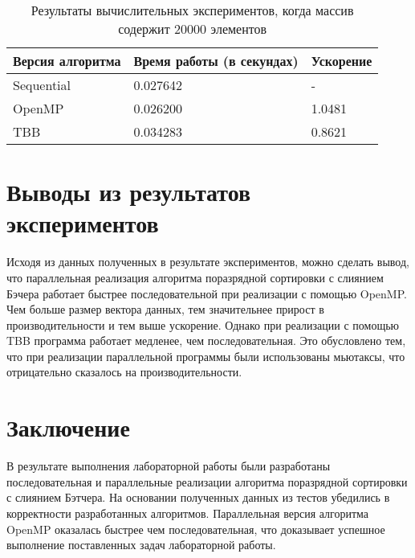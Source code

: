 \documentclass{report}
\begin{document}
\begin{table}[!h]
\caption{Результаты вычислительных экспериментов, когда массив содержит 20000 элементов}
\centering
\begin{tabular}{| p{2cm} | p{3cm} | p{4cm} |}
\hline
Версия алгоритма & Время работы (в секундах) & Ускорение  \\[5pt]
\hline
Sequential        & 0.027642        & -         \\
OpenMP        & 0.026200        & 1.0481          \\
TBB       & 0.034283        & 0.8621         \\


\hline
\end{tabular}
\end{table}

\newpage

\section*{Выводы из результатов экспериментов}
Исходя из данных полученных в результате экспериментов, можно сделать вывод, что параллельная реализация алгоритма поразрядной сортировки с слиянием Бэчера работает быстрее последовательной при реализации с помощью OpenMP. Чем больше размер вектора данных, тем значительнее прирост в производительности и тем выше ускорение. Однако при реализации с помощью TBB программа работает медленее, чем последовательная. Это обусловлено тем, что при реализации параллельной программы были использованы мьютаксы, что отрицательно сказалось на производительности.
\newpage

\section*{Заключение}
В результате выполнения лабораторной работы были  разработаны последовательная и параллельные реализации алгоритма поразрядной сортировки с слиянием Бэтчера. На основании полученных данных из тестов убедились в корректности разработанных алгоритмов. Параллельная версия алгоритма OpenMP оказалась быстрее чем последовательная, что доказывает успешное выполнение поставленных задач лабораторной работы.
\newpage

\end{document}

